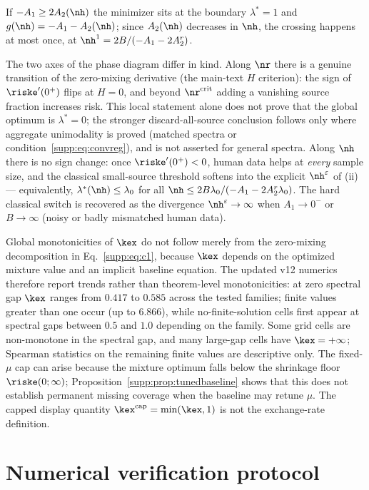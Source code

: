 If $-A_1 \ge 2A_2(\nh)$ the minimizer sits at the boundary $\lambda^* = 1$ and $g(\nh) = -A_1 - A_2(\nh)$; since $A_2(\nh)$ decreases in $\nh$, the crossing happens at most once, at $\nh^1 = 2B/(-A_1 - 2A_2^r)$.

\begin{remark}
The two axes of the phase diagram differ in kind.
Along $\nr$ there is a genuine transition of the zero-mixing derivative (the main-text $H$ criterion): the sign of $\riske'(0^+)$ flips at $H = 0$, and beyond $\nr^{\mathrm{crit}}$ adding a vanishing source fraction increases risk.
This local statement alone does not prove that the global optimum is $\lambda^*=0$; the stronger discard-all-source conclusion follows only where aggregate unimodality is proved (matched spectra or condition~\eqref{supp:eq:convreg}), and is not asserted for general spectra.
Along $\nh$ there is no sign change: once $\riske'(0^+) < 0$, human data helps at \emph{every} sample size, and the classical small-source threshold softens into the explicit $\nh^\varepsilon$ of (ii) --- equivalently, $\lambda^*(\nh) \le \lambda_0$ for all $\nh \le 2B\lambda_0/(-A_1 - 2A_2^r\lambda_0)$.
The hard classical switch is recovered as the divergence $\nh^\varepsilon \to \infty$ when $A_1 \to 0^-$ or $B \to \infty$ (noisy or badly mismatched human data).
\end{remark}

Global monotonicities of $\kex$ do not follow merely from the zero-mixing decomposition in Eq.~\eqref{supp:eq:c1}, because $\kex$ depends on the optimized mixture value and an implicit baseline equation.
The updated v12 numerics therefore report trends rather than theorem-level monotonicities: at zero spectral gap $\kex$ ranges from $0.417$ to $0.585$ across the tested families; finite values greater than one occur (up to $6.866$), while no-finite-solution cells first appear at spectral gaps between $0.5$ and $1.0$ depending on the family.
Some grid cells are non-monotone in the spectral gap, and many large-gap cells have $\kex=+\infty$; Spearman statistics on the remaining finite values are descriptive only.
The fixed-$\mu$ cap can arise because the mixture optimum falls below the shrinkage floor $\riske(0;\infty)$; Proposition~\ref{supp:prop:tunedbaseline} shows that this does not establish permanent missing coverage when the baseline may retune $\mu$.
The capped display quantity $\kex^{\mathrm{cap}}=\min(\kex,1)$ is not the exchange-rate definition.

\section{Numerical verification protocol}
\label{supp:numerics}

